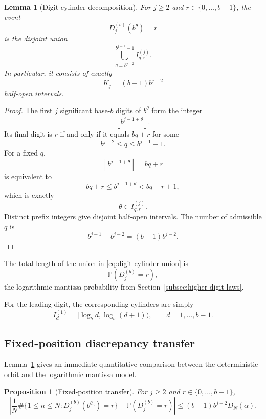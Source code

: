 \documentclass[11pt]{article}
\newtheorem{proposition}[theorem]{Proposition}
\newtheorem{lemma}[theorem]{Lemma}
\theoremstyle{definition}
\theoremstyle{remark}
\begin{document}
\begin{lemma}[Digit-cylinder decomposition]
\label{lem:digit-cylinder-decomposition}
For \(j\ge2\) and
\(r\in\{0,\ldots,b-1\}\), the event
\[
    D_j^{(b)}(b^\theta)=r
\]
is the disjoint union
\begin{equation}
    \bigcup_{q=b^{j-2}}^{b^{j-1}-1}
    I_{q,r}^{(j)}.
    \label{eq:digit-cylinder-union}
\end{equation}
In particular, it consists of exactly
\begin{equation}
\boxed{
    K_j=(b-1)b^{j-2}
}
\label{eq:K-j}
\end{equation}
half-open intervals.
\end{lemma}

\begin{proof}
The first \(j\) significant base-\(b\) digits of \(b^\theta\) form
the integer
\[
    \left\lfloor b^{j-1+\theta}\right\rfloor.
\]
Its final digit is \(r\) if and only if it equals \(bq+r\) for some
\[
    b^{j-2}\le q\le b^{j-1}-1.
\]
For a fixed \(q\),
\[
    \left\lfloor b^{j-1+\theta}\right\rfloor=bq+r
\]
is equivalent to
\[
    bq+r
    \le
    b^{j-1+\theta}
    <
    bq+r+1,
\]
which is exactly
\[
    \theta\in I_{q,r}^{(j)}.
\]
Distinct prefix integers give disjoint half-open intervals.  The
number of admissible \(q\) is
\[
    b^{j-1}-b^{j-2}
    =
    (b-1)b^{j-2}.
\]
\end{proof}

The total length of the union in
\eqref{eq:digit-cylinder-union} is
\[
    \mathbb P(D_j^{(b)}=r),
\]
the logarithmic-mantissa probability from
Section~\ref{subsec:higher-digit-laws}.

For the leading digit, the corresponding cylinders are simply
\begin{equation}
    I_d^{(1)}
    =
    [\log_b d,\log_b(d+1)),
    \qquad
    d=1,\ldots,b-1.
    \label{eq:first-digit-cylinder}
\end{equation}


\subsection{Fixed-position discrepancy transfer}
\label{subsec:fixed-position-transfer}

Lemma~\ref{lem:digit-cylinder-decomposition} gives an immediate
quantitative comparison between the deterministic orbit and the
logarithmic mantissa model.

\begin{proposition}[Fixed-position transfer]
\label{prop:fixed-position-transfer}
For \(j\ge2\) and
\(r\in\{0,\ldots,b-1\}\),
\begin{equation}
\boxed{
\left|
    \frac1N
    \#\{1\le n\le N:
        D_j^{(b)}(b^{\theta_n})=r\}
    -
    \mathbb P(D_j^{(b)}=r)
\right|
\le
    (b-1)b^{j-2}D_N(\alpha).
}
\label{eq:fixed-position-transfer}
\end{equation}
\end{proposition}
\end{document}
